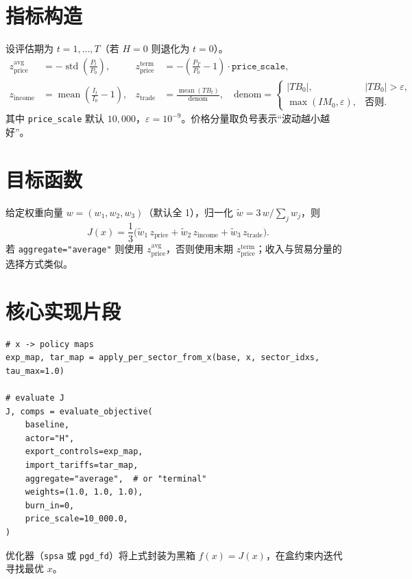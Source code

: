 \documentclass[11pt]{article}
\begin{document}
\section{指标构造}
设评估期为 $t=1,\dots,T$（若 $H=0$ 则退化为 $t=0$）。
\begin{align*}
    z_{\text{price}}^{\text{avg}} &= -\operatorname{std}\!\left(\frac{P_t}{P_0}\right), &
    z_{\text{price}}^{\text{term}} &= -\left(\frac{P_T}{P_0}-1\right)\cdot \texttt{price\_scale}, \\
    z_{\text{income}} &= \operatorname{mean}\!\left(\frac{I_t}{I_0}-1\right), &
    z_{\text{trade}} &= \frac{\operatorname{mean}(TB_t)}{\text{denom}},\quad
    \text{denom} = \begin{cases}
        |TB_0|, & |TB_0|> \varepsilon,\\
        \max(IM_0,\varepsilon), & \text{否则}.
    \end{cases}
\end{align*}
其中 \texttt{price\_scale} 默认 $10{,}000$，$\varepsilon=10^{-9}$。价格分量取负号表示“波动越小越好”。

\section{目标函数}
给定权重向量 $w=(w_1,w_2,w_3)$（默认全 1），归一化
$\tilde{w} = 3\,w / \sum_j w_j$，则
\[
    J(x) = \frac{1}{3}\Big(\tilde{w}_1\, z_{\text{price}} + \tilde{w}_2\, z_{\text{income}} + \tilde{w}_3\, z_{\text{trade}}\Big).
\]
若 \verb|aggregate="average"| 则使用 $z^{\text{avg}}_{\text{price}}$，否则使用末期 $z^{\text{term}}_{\text{price}}$；收入与贸易分量的选择方式类似。

\section{核心实现片段}
\begin{lstlisting}[basicstyle=\ttfamily\small, breaklines=true]
# x -> policy maps
exp_map, tar_map = apply_per_sector_from_x(base, x, sector_idxs, tau_max=1.0)

# evaluate J
J, comps = evaluate_objective(
    baseline,
    actor="H",
    export_controls=exp_map,
    import_tariffs=tar_map,
    aggregate="average",  # or "terminal"
    weights=(1.0, 1.0, 1.0),
    burn_in=0,
    price_scale=10_000.0,
)
\end{lstlisting}
优化器（\verb|spsa| 或 \verb|pgd_fd|）将上式封装为黑箱 $f(x)=J(x)$，在盒约束内迭代寻找最优 $x$。
\end{document}
